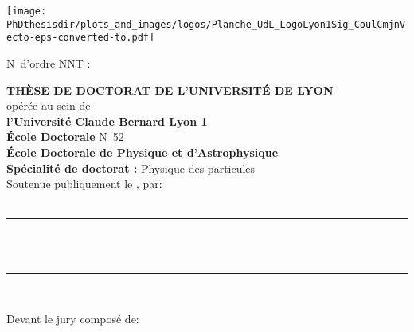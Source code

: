 \thispagestyle{empty}
\begin{center}

\texttt{[image: \\PhDthesisdir/plots\_and\_images/logos/Planche\_UdL\_LogoLyon1Sig\_CoulCmjnVecto-eps-converted-to.pdf]}

\begin{flushleft}
N\degree\ d'ordre NNT : \NordreNNT
\end{flushleft}
\vspace{\baselineskip}
\large{\textbf{THÈSE DE DOCTORAT DE L’UNIVERSITÉ DE LYON}}\\
opérée au sein de\\
\textbf{l’Université Claude Bernard Lyon 1}\\
\vspace{\baselineskip}
\textbf{École Doctorale} N\degree\ 52\\
\textbf{École Doctorale de Physique et d'Astrophysique}\\
\vspace{\baselineskip}
\textbf{Spécialité de doctorat :} Physique des particules\\
\vspace{\baselineskip}
\vspace{\baselineskip}
\vspace{\baselineskip}
Soutenue publiquement le \insertdate, par:\\
\large{\textbf{\insertauthor}}\\
\vspace{\baselineskip}
\vspace{\baselineskip}
\rule{\linewidth}{.5pt}\\
\vspace{\baselineskip}
\large{\textbf{\inserttitle}}\\
\vspace{\baselineskip}
\rule{\linewidth}{.5pt}\\
\vspace{\baselineskip}
\vspace{\baselineskip}
\begin{flushleft}
    Devant le jury composé de:
\end{flushleft}



\vfill

\end{center}
